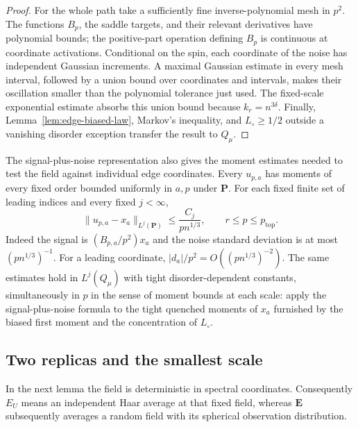 \begin{proof}
For the whole path take a sufficiently fine inverse-polynomial mesh in
$p^2$. The functions $B_p$, the saddle targets, and their relevant
derivatives have polynomial bounds; the positive-part operation defining
$B_p$ is continuous at coordinate activations. Conditional on the spin,
each coordinate of the noise has independent Gaussian increments. A maximal
Gaussian estimate in every mesh interval, followed by a union bound over
coordinates and intervals, makes their oscillation smaller than the
polynomial tolerance just used. The fixed-scale exponential estimate
absorbs this union bound because $k_r=n^{3\delta}$. Finally,
Lemma~\ref{lem:edge-biased-law}, Markov's inequality, and $L_\circ\ge1/2$
outside a vanishing disorder exception transfer the result to $Q_\mu$.
\end{proof}

The signal-plus-noise representation also gives the moment estimates
needed to test the field against individual edge coordinates. Every
$u_{p,a}$ has moments of every fixed order bounded uniformly in $a,p$ under
$\mathbf P$. For each fixed finite set of leading indices and every fixed
$j<\infty$,
\begin{equation}\label{eq:source-8}
 \|u_{p,a}-x_a\|_{L^j(\mathbf P)}
 \le \frac{C_j}{pn^{1/3}},\qquad r\le p\le p_{\mathrm{top}}.
\end{equation}
Indeed the signal is $(B_{p,a}/p^2)x_a$ and the noise standard deviation is
at most $(pn^{1/3})^{-1}$. For a leading coordinate,
$|d_a|/p^2=O((pn^{1/3})^{-2})$. The same estimates hold in $L^j(Q_\mu)$
with tight disorder-dependent constants, simultaneously in $p$ in the sense
of moment bounds at each scale: apply the signal-plus-noise formula to the
tight quenched moments of $x_a$ furnished by the biased first moment and
the concentration of $L_\circ$.

\subsection{Two replicas and the smallest scale}

In the next lemma the field is deterministic in spectral coordinates.
Consequently $E_U$ means an independent Haar average at that fixed field,
whereas $\mathbf E$ subsequently averages a random field with its
spherical observation distribution.

